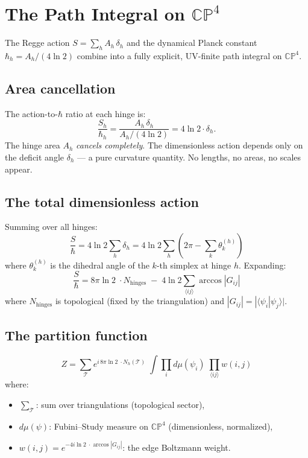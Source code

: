 \section{The Path Integral on $\mathbb{CP}^4$}
\label{app:path_integral}

The Regge action $S = \sum_h A_h\,\delta_h$ and the dynamical Planck constant $\hbar_h = A_h/(4\ln 2)$ combine into a fully explicit, UV-finite path integral on $\mathbb{CP}^4$.

\subsection{Area cancellation}

The action-to-$\hbar$ ratio at each hinge is:
\begin{equation}
\frac{S_h}{\hbar_h} = \frac{A_h\,\delta_h}{A_h/(4\ln 2)} = 4\ln 2 \cdot \delta_h.
\end{equation}
The hinge area $A_h$ \emph{cancels completely}. The dimensionless action depends only on the deficit angle $\delta_h$ --- a pure curvature quantity. No lengths, no areas, no scales appear.

\subsection{The total dimensionless action}

Summing over all hinges:
\begin{equation}
\frac{S}{\hbar} = 4\ln 2\sum_h \delta_h = 4\ln 2\sum_h \left(2\pi - \sum_{k} \theta_k^{(h)}\right)
\end{equation}
where $\theta_k^{(h)}$ is the dihedral angle of the $k$-th simplex at hinge $h$. Expanding:
\begin{equation}
\boxed{\frac{S}{\hbar} = 8\pi\ln 2\;\cdot N_\text{hinges} \;-\; 4\ln 2\!\!\sum_{\langle ij\rangle}\!\! \arccos|G_{ij}|}
\end{equation}
where $N_\text{hinges}$ is topological (fixed by the triangulation) and $|G_{ij}| = |\langle\psi_i|\psi_j\rangle|$.

\subsection{The partition function}

\begin{equation}
\boxed{Z = \sum_{\mathcal{T}} e^{i\,8\pi\ln 2\;\cdot N_h(\mathcal{T})}\;\int\!\prod_i d\mu(\psi_i)\;\prod_{\langle ij\rangle} w(i,j)}
\end{equation}
where:
\begin{itemize}
\item $\sum_\mathcal{T}$: sum over triangulations (topological sector),
\item $d\mu(\psi)$: Fubini--Study measure on $\mathbb{CP}^4$ (dimensionless, normalized),
\item $w(i,j) = e^{-4i\ln 2\;\cdot\arccos|G_{ij}|}$: the edge Boltzmann weight.
\end{itemize}


